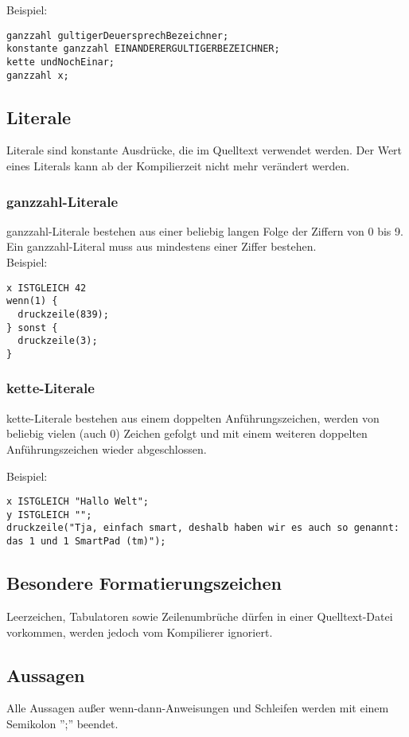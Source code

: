 \documentclass[12pt, a4paper, oneside, ngerman]{article}
\begin{document}
\medskip
\noindent
Beispiel: \begin{lstlisting}[frame=single]
ganzzahl gultigerDeuersprechBezeichner;
konstante ganzzahl EINANDERERGULTIGERBEZEICHNER;
kette undNochEinar;
ganzzahl x;
\end{lstlisting}


\subsection{Literale}
Literale sind konstante Ausdrücke, die im Quelltext verwendet werden. Der Wert eines Literals kann ab der Kompilierzeit nicht mehr verändert werden.

\subsubsection{ganzzahl-Literale}
ganzzahl-Literale bestehen aus einer beliebig langen Folge der Ziffern von 0 bis 9. Ein ganzzahl-Literal muss aus mindestens einer Ziffer bestehen.\\

\medskip
\noindent
Beispiel: \begin{lstlisting}[frame=single] 
x ISTGLEICH 42
wenn(1) {
  druckzeile(839);
} sonst {
  druckzeile(3);
}
\end{lstlisting}

\subsubsection{kette-Literale}
kette-Literale bestehen aus einem doppelten Anführungszeichen, werden von beliebig vielen (auch 0) Zeichen gefolgt und mit einem weiteren doppelten Anführungszeichen wieder abgeschlossen.

\medskip
\noindent
Beispiel: \begin{lstlisting}[frame=single] 
x ISTGLEICH "Hallo Welt";
y ISTGLEICH "";
druckzeile("Tja, einfach smart, deshalb haben wir es auch so genannt: das 1 und 1 SmartPad (tm)"); 
\end{lstlisting}


\subsection{Besondere Formatierungszeichen} 
Leerzeichen, Tabulatoren sowie Zeilenumbrüche dürfen in einer Quelltext-Datei vorkommen, werden jedoch vom Kompilierer ignoriert.

\subsection{Aussagen}
Alle Aussagen außer wenn-dann-Anweisungen und Schleifen werden mit einem Semikolon '';'' beendet.
\end{document}
